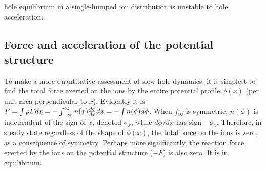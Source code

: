 \documentclass[pre]{revtex4-2}
\begin{document}
hole equilibrium in a single-humped ion distribution is unstable to
hole acceleration.

\subsection{Force and acceleration of the potential structure}

To make a more quantitative assessment of slow hole dynamics, it is
simplest to find the total force exerted on the ions by the entire
potential profile $\phi(x)$ (per unit area perpendicular to
$x$). Evidently it is
$F=\int \rho Edx=-\int_{-\infty}^{\infty} n(x) {d\phi\over dx}dx
=-\int n(\phi) d\phi$. When $f_\infty$ is symmetric, $n(\phi)$ is
independent of the sign of $x$, denoted $\sigma_x$, while $d\phi/dx$ has sign
$-\sigma_x$. Therefore, in steady state regardless of the shape of
$\phi(x)$, the total force on the ions is zero, as a consequence of
symmetry. Perhaps more significantly, the reaction force exerted by
the ions on the potential structure ($-F$) is also zero. It is in
equilibrium.
\end{document}

